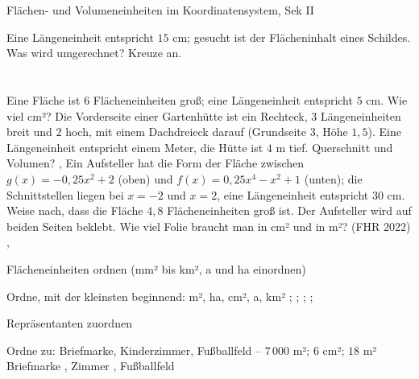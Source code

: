 \begin{aufgabe}{Flächen- und Volumeneinheiten im Koordinatensystem, Sek II}
\begin{teile}
\teil Eine Längeneinheit entspricht $15$ cm; gesucht ist der Flächeninhalt eines Schildes. Was wird umgerechnet? Kreuze an.\\ \\ \\ 
\teil Eine Fläche ist $6$ Flächeneinheiten groß; eine Längeneinheit entspricht $5$ cm. Wie viel cm²? \leerfeld[cm²]
\teil Die Vorderseite einer Gartenhütte ist ein Rechteck, $3$ Längeneinheiten breit und $2$ hoch, mit einem Dachdreieck darauf (Grundseite $3$, Höhe $1{,}5$). Eine Längeneinheit entspricht einem Meter, die Hütte ist $4$ m tief. Querschnitt und Volumen? \leerfeld[m²] , \leerfeld[m³]
\teil Ein Aufsteller hat die Form der Fläche zwischen $g(x) = -0{,}25x^2 + 2$ (oben) und $f(x) = 0{,}25x^4 - x^2 + 1$ (unten); die Schnittstellen liegen bei $x = -2$ und $x = 2$, eine Längeneinheit entspricht $30$ cm. Weise nach, dass die Fläche $4{,}8$ Flächeneinheiten groß ist. Der Aufsteller wird auf beiden Seiten beklebt. Wie viel Folie braucht man in cm² und in m²? \hfill (FHR 2022) \\ \leerfeld[cm²] , \leerfeld[m²]
\end{teile}
\end{aufgabe}

\begin{aufgabe}{Flächeneinheiten ordnen (mm² bis km², a und ha einordnen)}
\begin{teile}
\teil Ordne, mit der kleinsten beginnend: m², ha, cm², a, km² \leerfeld ; \leerfeld ; \leerfeld ; \leerfeld ; \leerfeld
\end{teile}
\end{aufgabe}

\begin{aufgabe}{Repräsentanten zuordnen}
\begin{teile}
\teil Ordne zu: Briefmarke, Kinderzimmer, Fußballfeld – $7\,000$ m²; $6$ cm²; $18$ m² Briefmarke \leerfeld , Zimmer \leerfeld , Fußballfeld \leerfeld
\end{teile}
\end{aufgabe}

